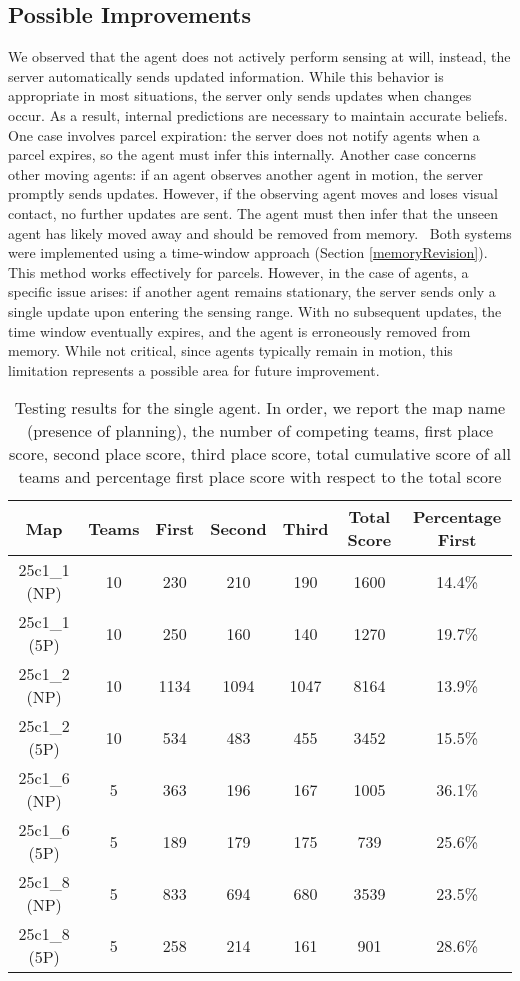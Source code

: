     \subsection{Possible Improvements}
        We observed that the agent does not actively perform sensing at will, instead, the server automatically sends updated information. While this behavior is appropriate in most situations, the server only sends updates when changes occur. As a result, internal predictions are necessary to maintain accurate beliefs. One case involves parcel expiration: the server does not notify agents when a parcel expires, so the agent must infer this internally. Another case concerns other moving agents: if an agent observes another agent in motion, the server promptly sends updates. However, if the observing agent moves and loses visual contact, no further updates are sent. The agent must then infer that the unseen agent has likely moved away and should be removed from memory.
        \medskip\
        Both systems were implemented using a time-window approach (Section \ref{memoryRevision}). This method works effectively for parcels. However, in the case of agents, a specific issue arises: if another agent remains stationary, the server sends only a single update upon entering the sensing range. With no subsequent updates, the time window eventually expires, and the agent is erroneously removed from memory. While not critical, since agents typically remain in motion, this limitation represents a possible area for future improvement.

\begin{table}[h!]
    \centering
    \begin{tabular}{|c|c|c|c|c|c|c|}
        \hline
        Map & Teams & First & Second & Third & Total Score & Percentage First \\
        \hline
        25c1\_1 (NP)  & 10   & 230   & 210   & 190  & 1600  & 14.4\%  \\
        25c1\_1 (5P)  & 10   & 250   & 160   & 140  & 1270  & 19.7\% \\
        25c1\_2 (NP)  & 10  & 1134  & 1094  & 1047  & 8164  & 13.9\% \\
        25c1\_2 (5P)  & 10   & 534   & 483   & 455  & 3452  & 15.5\% \\
        25c1\_6 (NP)   & 5   & 363   & 196   & 167  & 1005  & 36.1\% \\
        25c1\_6 (5P)   & 5   & 189   & 179   & 175   & 739  & 25.6\% \\
        25c1\_8 (NP)   & 5   & 833   & 694   & 680  & 3539  & 23.5\% \\
        25c1\_8 (5P)   & 5   & 258   & 214   & 161   & 901  & 28.6\% \\
        \hline
    \end{tabular}
    \caption{Testing results for the single agent. In order, we report the map name (presence of planning), the number of competing teams, first place score, second place score, third place score, total cumulative score of all teams and percentage first place score with respect to the total score}
    \label{tab:table_1}
\end{table}

